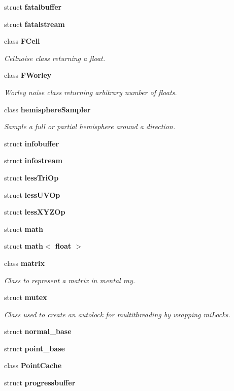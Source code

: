 \begin{CompactItemize}
struct {\bf fatalbuffer}
\item 
struct {\bf fatalstream}
\item 
class {\bf FCell}
\begin{CompactList}\small\item\em Cellnoise class returning a float. \item\end{CompactList}\item 
class {\bf FWorley}
\begin{CompactList}\small\item\em Worley noise class returning arbitrary number of floats. \item\end{CompactList}\item 
class {\bf hemisphere\-Sampler}
\begin{CompactList}\small\item\em Sample a full or partial hemisphere around a direction. \item\end{CompactList}\item 
struct {\bf infobuffer}
\item 
struct {\bf infostream}
\item 
struct {\bf less\-Tri\-Op}
\item 
struct {\bf less\-UVOp}
\item 
struct {\bf less\-XYZOp}
\item 
struct {\bf math}
\item 
struct {\bf math$<$ float $>$}
\item 
class {\bf matrix}
\begin{CompactList}\small\item\em Class to represent a matrix in mental ray. \item\end{CompactList}\item 
struct {\bf mutex}
\begin{CompactList}\small\item\em Class used to create an autolock for multithreading by wrapping mi\-Locks. \item\end{CompactList}\item 
struct {\bf normal\_\-base}
\item 
struct {\bf point\_\-base}
\item 
class {\bf Point\-Cache}
\item 
struct {\bf progressbuffer}
\item 

\end{CompactItemize}
